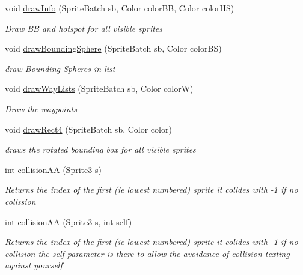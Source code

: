 \begin{DoxyCompactItemize}
void \mbox{\hyperlink{class_r_c___framework_1_1_sprite_list_a172fdc75116eeac16731188b46b7dac6}{draw\+Info}} (Sprite\+Batch sb, Color color\+BB, Color color\+HS)
\begin{DoxyCompactList}\small\item\em Draw BB and hotspot for all visible sprites \end{DoxyCompactList}\item 
void \mbox{\hyperlink{class_r_c___framework_1_1_sprite_list_a3927cc35567aca5b96ebd966a8b480be}{draw\+Bounding\+Sphere}} (Sprite\+Batch sb, Color color\+BS)
\begin{DoxyCompactList}\small\item\em draw Bounding Spheres in list \end{DoxyCompactList}\item 
void \mbox{\hyperlink{class_r_c___framework_1_1_sprite_list_af03b9a1d139cffcaa9cb32170788998e}{draw\+Way\+Lists}} (Sprite\+Batch sb, Color colorW)
\begin{DoxyCompactList}\small\item\em Draw the waypoints \end{DoxyCompactList}\item 
void \mbox{\hyperlink{class_r_c___framework_1_1_sprite_list_adbb96b3d84627126045be2b406c9ab12}{draw\+Rect4}} (Sprite\+Batch sb, Color color)
\begin{DoxyCompactList}\small\item\em draws the rotated bounding box for all visible sprites \end{DoxyCompactList}\item 
int \mbox{\hyperlink{class_r_c___framework_1_1_sprite_list_a3cb2f1e0826f5a00623500c8f6e824e9}{collision\+AA}} (\mbox{\hyperlink{class_r_c___framework_1_1_sprite3}{Sprite3}} s)
\begin{DoxyCompactList}\small\item\em Returns the index of the first (ie lowest numbered) sprite it colides with -\/1 if no colission \end{DoxyCompactList}\item 
int \mbox{\hyperlink{class_r_c___framework_1_1_sprite_list_aae4b98d6d9acdf7c2b2160eb6a4189d8}{collision\+AA}} (\mbox{\hyperlink{class_r_c___framework_1_1_sprite3}{Sprite3}} s, int self)
\begin{DoxyCompactList}\small\item\em Returns the index of the first (ie lowest numbered) sprite it colides with -\/1 if no collision the self parameter is there to allow the avoidance of collision texting against yourself \end{DoxyCompactList}\item 

\end{DoxyCompactItemize}
